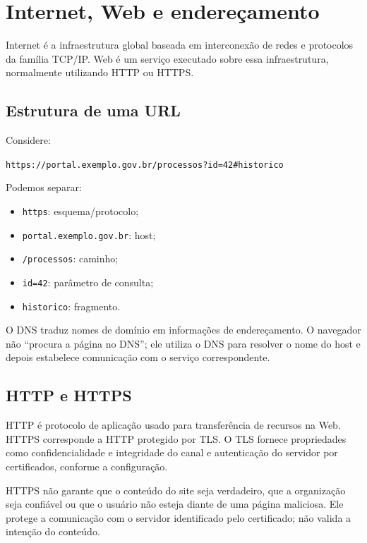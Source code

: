 \section{Internet, Web e endereçamento}

Internet é a infraestrutura global baseada em interconexão de redes e protocolos da família TCP/IP. Web é um serviço executado sobre essa infraestrutura, normalmente utilizando HTTP ou HTTPS.

\subsection{Estrutura de uma URL}

Considere:
\begin{center}
\texttt{https://portal.exemplo.gov.br/processos?id=42\#historico}
\end{center}

Podemos separar:
\begin{itemize}
\item \texttt{https}: esquema/protocolo;
\item \texttt{portal.exemplo.gov.br}: host;
\item \texttt{/processos}: caminho;
\item \texttt{id=42}: parâmetro de consulta;
\item \texttt{historico}: fragmento.
\end{itemize}

O DNS traduz nomes de domínio em informações de endereçamento. O navegador não ``procura a página no DNS''; ele utiliza o DNS para resolver o nome do host e depois estabelece comunicação com o serviço correspondente.

\subsection{HTTP e HTTPS}

HTTP é protocolo de aplicação usado para transferência de recursos na Web. HTTPS corresponde a HTTP protegido por TLS. O TLS fornece propriedades como confidencialidade e integridade do canal e autenticação do servidor por certificados, conforme a configuração.

\begin{atencao}
HTTPS não garante que o conteúdo do site seja verdadeiro, que a organização seja confiável ou que o usuário não esteja diante de uma página maliciosa. Ele protege a comunicação com o servidor identificado pelo certificado; não valida a intenção do conteúdo.
\end{atencao}

